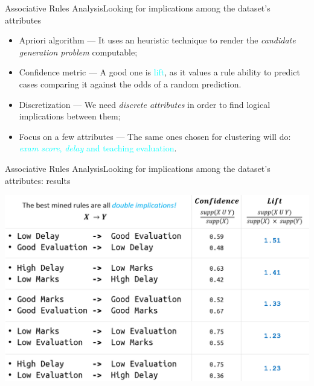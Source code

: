 \begin{frame}{Associative Rules Analysis}{Looking for implications among the dataset's attributes}
\vspace{0,2cm}
 \vspace{0,2cm}

	\begin{block}{}
		\begin{itemize}
			\item<1-> \alert{Apriori algorithm} --- It uses an heuristic technique to render the \emph{candidate generation problem} computable;\vspace{0.2cm}
			\item<2-> \alert{Confidence metric} --- A good one is \textcolor{cyan}{lift}, as it values a rule ability to predict cases comparing it against the odds of a random prediction.
            \item<3-> \alert{Discretization} --- We need \emph{discrete attributes} in order to find logical implications between them;\vspace{0.2cm}
            \item<4-> \alert{Focus on a few attributes} --- The same ones chosen for clustering will do: \textcolor{cyan}{\emph{exam score}, \textcolor{cyan}{\emph{delay} and \textcolor{cyan}{teaching evaluation}}}.
		\end{itemize}
	\end{block}

\end{frame}

\begin{frame}{Associative Rules Analysis}{Looking for implications among the dataset's attributes: results}

\vspace{1mm}
\noindent\hspace{-5mm}\includegraphics[scale=0.26]{ass6.png}

\end{frame}
